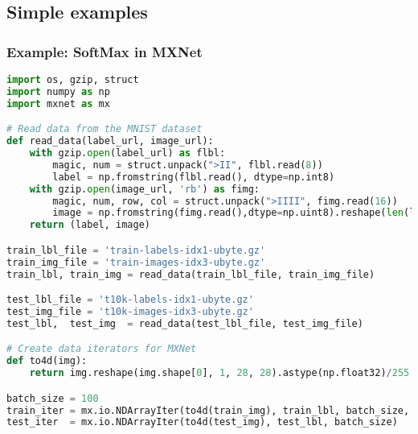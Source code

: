 \subsection{Simple examples}

\begin{frame}[fragile]
  \MyLogo
  \frametitle{Example: SoftMax in MXNet}  

\begin{lstlisting}[language=python]
import os, gzip, struct
import numpy as np
import mxnet as mx

# Read data from the MNIST dataset
def read_data(label_url, image_url):
    with gzip.open(label_url) as flbl:
        magic, num = struct.unpack(">II", flbl.read(8))
        label = np.fromstring(flbl.read(), dtype=np.int8)
    with gzip.open(image_url, 'rb') as fimg:
        magic, num, row, col = struct.unpack(">IIII", fimg.read(16))
        image = np.fromstring(fimg.read(),dtype=np.uint8).reshape(len(label),row,col)
    return (label, image)

train_lbl_file = 'train-labels-idx1-ubyte.gz'
train_img_file = 'train-images-idx3-ubyte.gz'
train_lbl, train_img = read_data(train_lbl_file, train_img_file)

test_lbl_file = 't10k-labels-idx1-ubyte.gz'
test_img_file = 't10k-images-idx3-ubyte.gz'
test_lbl,  test_img  = read_data(test_lbl_file, test_img_file)

# Create data iterators for MXNet
def to4d(img):
    return img.reshape(img.shape[0], 1, 28, 28).astype(np.float32)/255

batch_size = 100
train_iter = mx.io.NDArrayIter(to4d(train_img), train_lbl, batch_size, shuffle=True)
test_iter  = mx.io.NDArrayIter(to4d(test_img), test_lbl, batch_size)

\end{lstlisting}

\end{frame}


